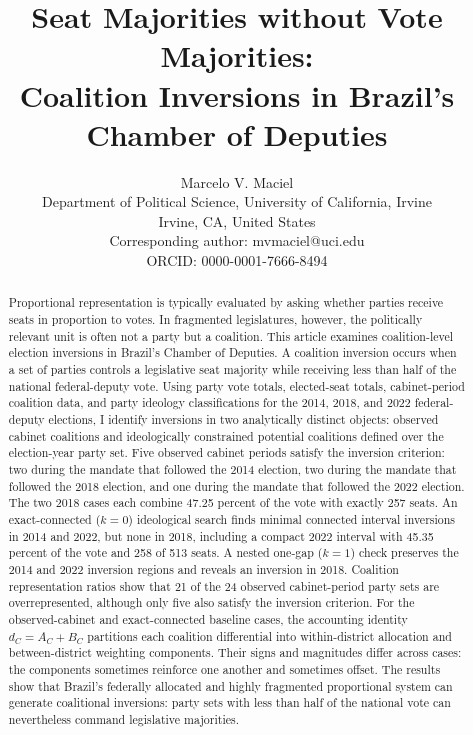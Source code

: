 \documentclass[11pt]{article}
\title{Seat Majorities without Vote Majorities:\\[0.3em]Coalition Inversions in Brazil's Chamber of Deputies}
\author{
Marcelo V. Maciel\\
Department of Political Science, University of California, Irvine\\
Irvine, CA, United States\\
Corresponding author: mvmaciel@uci.edu\\
ORCID: 0000-0001-7666-8494 }
\date{}
\begin{document}
\maketitle

\begin{abstract}
  Proportional representation is typically evaluated by asking whether parties
  receive seats in proportion to votes. In fragmented legislatures, however, the
  politically relevant unit is often not a party but a coalition. This article
  examines coalition-level election inversions in Brazil's Chamber of Deputies.
  A coalition inversion occurs when a set of parties controls a legislative seat
  majority while receiving less than half of the national federal-deputy vote.
  Using party vote totals, elected-seat totals, cabinet-period coalition data,
  and party ideology classifications for the 2014, 2018, and 2022 federal-deputy
  elections, I identify inversions in two analytically distinct objects:
  observed cabinet coalitions and ideologically constrained potential
  coalitions defined over the election-year party set. Five observed cabinet
  periods satisfy the inversion
  criterion: two during the mandate that followed the 2014 election, two during
  the mandate that followed the 2018 election, and one during the mandate that
  followed the 2022 election. The two 2018 cases each combine 47.25 percent of
  the vote with exactly 257 seats. An exact-connected (\(k=0\)) ideological
  search finds minimal connected interval inversions in 2014 and 2022, but none
  in 2018, including a compact 2022 interval with 45.35 percent of the vote and
  258 of 513 seats. A nested one-gap (\(k=1\)) check preserves the 2014 and 2022
  inversion regions and reveals an inversion in 2018. Coalition representation
  ratios show that 21 of the 24 observed
  cabinet-period party sets are overrepresented, although only five also
  satisfy the inversion criterion. For the observed-cabinet and exact-connected
  baseline cases, the accounting identity \(d_C=A_C+B_C\) partitions each
  coalition differential
  into within-district allocation and between-district weighting components.
  Their signs and magnitudes differ across cases: the components sometimes
  reinforce one another and sometimes offset. The results show that Brazil's federally
  allocated and highly fragmented proportional system can generate coalitional
  inversions: party sets with less than half of the national vote can
  nevertheless command legislative majorities.
\end{abstract}
\end{document}
